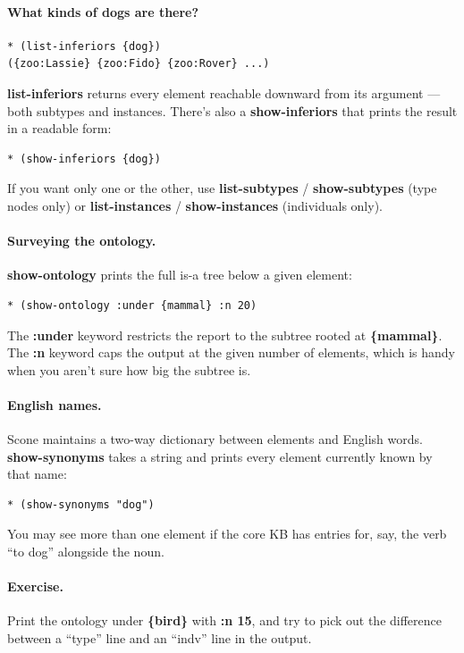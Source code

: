 \documentclass[titlepage,twoside,openright,11pt]{article}
\begin{document}
\paragraph{What kinds of dogs are there?}

\begin{verbatim}
* (list-inferiors {dog})
({zoo:Lassie} {zoo:Fido} {zoo:Rover} ...)
\end{verbatim}

\textbf{list-inferiors} returns every element reachable downward
from its argument --- both subtypes and instances. There's also a
\textbf{show-inferiors} that prints the result in a readable form:

\begin{verbatim}
* (show-inferiors {dog})
\end{verbatim}

If you want only one or the other, use \textbf{list-subtypes} /
\textbf{show-subtypes} (type nodes only) or \textbf{list-instances}
/ \textbf{show-instances} (individuals only).

\paragraph{Surveying the ontology.}
\textbf{show-ontology} prints the full is-a tree below a given
element:

\begin{verbatim}
* (show-ontology :under {mammal} :n 20)
\end{verbatim}

The \textbf{:under} keyword restricts the report to the subtree
rooted at \textbf{\{mammal\}}. The \textbf{:n} keyword caps the
output at the given number of elements, which is handy when you
aren't sure how big the subtree is.

\paragraph{English names.}
Scone maintains a two-way dictionary between elements and English
words. \textbf{show-synonyms} takes a string and prints every
element currently known by that name:

\begin{verbatim}
* (show-synonyms "dog")
\end{verbatim}

You may see more than one element if the core KB has entries for,
say, the verb ``to dog'' alongside the noun.

\paragraph{Exercise.}
Print the ontology under \textbf{\{bird\}} with \textbf{:n 15}, and
try to pick out the difference between a ``type'' line and an
``indv'' line in the output.
\end{document}
